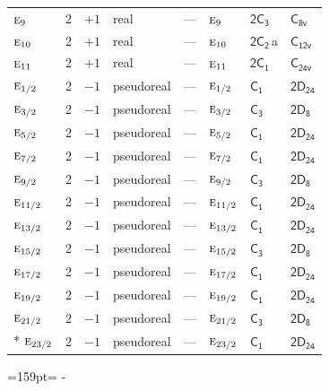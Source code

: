 \documentclass[10pt,a4paper]{article}
\makeatletter
\def\grouprule#1#2{\noalign{\marks\LTgroupmarks{\the\belowrulesep}\nobreak\vskip#1%
  \vskip\aboverulesep}\multispan\LT@cols\unskip{\leaders\hrule\@height#2\hfill\kern\z@}\cr
  \noalign{\penalty\LTrulebreak\vskip\belowrulesep\global\@lastruleclass\z@}}
\newcommand{\needspace}[1]{\par\penalty-100\begingroup\dimen0=#1\relax\dimen2=\pagegoal
  \advance\dimen2-\pagetotal\ifdim\dimen0>\dimen2\relax\ifdim\dimen2>0pt\vfil\break\fi\fi
  \endgroup}
\numberwithin{equation}{section}
\newcommand{\grp}[1]{\mathsf{#1}}
\newcommand{\irr}[1]{\text{\normalfont\scshape #1}}
\newcommand{\clsletter}[1]{\,{\scriptsize\color{black!55}#1}}
\makeatother
\begin{document}
{\begin{longtable}{@{}lrrlllll@{}}
$\irr{e}_{9}$ & 2 & $+1$ & real & --- & $\irr{e}_{9}$ & \href{2C3.pdf}{$\grp{2C_{3}}$} & \href{../../../rotation/data/pdf/C8v.pdf}{$\grp{C_{8v}}$}\\
$\irr{e}_{10}$ & 2 & $+1$ & real & --- & $\irr{e}_{10}$ & \href{2C2.pdf}{$\grp{2C_{2}}$}\clsletter{a} & \href{../../../rotation/data/pdf/C12v.pdf}{$\grp{C_{12v}}$}\\
$\irr{e}_{11}$ & 2 & $+1$ & real & --- & $\irr{e}_{11}$ & \href{2C1.pdf}{$\grp{2C_{1}}$} & $\grp{C_{24v}}$\\
\grouprule{0pt}{\lightrulewidth}
$\irr{e}_{1/2}$ & 2 & $-1$ & pseudoreal & --- & $\irr{e}_{1/2}$ & \href{C1.pdf}{$\grp{C_{1}}$} & $\grp{2D_{24}}$\\
$\irr{e}_{3/2}$ & 2 & $-1$ & pseudoreal & --- & $\irr{e}_{3/2}$ & \href{C3.pdf}{$\grp{C_{3}}$} & \href{2D8.pdf}{$\grp{2D_{8}}$}\\
$\irr{e}_{5/2}$ & 2 & $-1$ & pseudoreal & --- & $\irr{e}_{5/2}$ & \href{C1.pdf}{$\grp{C_{1}}$} & $\grp{2D_{24}}$\\
$\irr{e}_{7/2}$ & 2 & $-1$ & pseudoreal & --- & $\irr{e}_{7/2}$ & \href{C1.pdf}{$\grp{C_{1}}$} & $\grp{2D_{24}}$\\
$\irr{e}_{9/2}$ & 2 & $-1$ & pseudoreal & --- & $\irr{e}_{9/2}$ & \href{C3.pdf}{$\grp{C_{3}}$} & \href{2D8.pdf}{$\grp{2D_{8}}$}\\
$\irr{e}_{11/2}$ & 2 & $-1$ & pseudoreal & --- & $\irr{e}_{11/2}$ & \href{C1.pdf}{$\grp{C_{1}}$} & $\grp{2D_{24}}$\\
$\irr{e}_{13/2}$ & 2 & $-1$ & pseudoreal & --- & $\irr{e}_{13/2}$ & \href{C1.pdf}{$\grp{C_{1}}$} & $\grp{2D_{24}}$\\
$\irr{e}_{15/2}$ & 2 & $-1$ & pseudoreal & --- & $\irr{e}_{15/2}$ & \href{C3.pdf}{$\grp{C_{3}}$} & \href{2D8.pdf}{$\grp{2D_{8}}$}\\
$\irr{e}_{17/2}$ & 2 & $-1$ & pseudoreal & --- & $\irr{e}_{17/2}$ & \href{C1.pdf}{$\grp{C_{1}}$} & $\grp{2D_{24}}$\\
$\irr{e}_{19/2}$ & 2 & $-1$ & pseudoreal & --- & $\irr{e}_{19/2}$ & \href{C1.pdf}{$\grp{C_{1}}$} & $\grp{2D_{24}}$\\
$\irr{e}_{21/2}$ & 2 & $-1$ & pseudoreal & --- & $\irr{e}_{21/2}$ & \href{C3.pdf}{$\grp{C_{3}}$} & \href{2D8.pdf}{$\grp{2D_{8}}$}\\*
$\irr{e}_{23/2}$ & 2 & $-1$ & pseudoreal & --- & $\irr{e}_{23/2}$ & \href{C1.pdf}{$\grp{C_{1}}$} & $\grp{2D_{24}}$\\
\bottomrule\end{longtable}}
\needspace{159pt}
\end{document}
